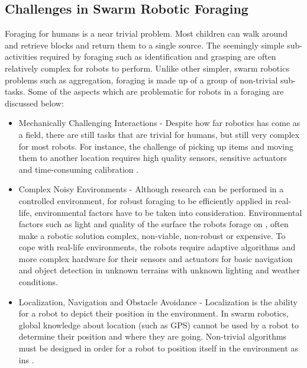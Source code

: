
\subsection{Challenges in Swarm Robotic Foraging}
\label{challengesinforaging}

Foraging for humans is a near trivial problem. Most children can walk around and retrieve blocks and return them to a single source. The seemingly simple sub-activities required by foraging such as identification and grasping are often relatively complex for robots to perform. Unlike other simpler, swarm robotics problems such as aggregation, foraging is made up of a group of non-trivial sub-tasks. Some of the aspects which are problematic for robots in a foraging are discussed below:

\begin{itemize}
\item Mechanically Challenging Interactions - Despite how far robotics has come as a field, there are still tasks that are trivial for humans, but still very complex for most robots. For instance, the challenge of picking up items \cite{saxena2008robotic} and moving them to another location requires high quality sensors, sensitive actuators and time-consuming calibration \cite{mondada2005cooperation}. 

\item Complex Noisy Environments - Although research can be performed in a controlled environment, for robust foraging to be efficiently applied in real-life, environmental factors have to be taken into consideration. Environmental factors such as light \cite{browning2005real,jungel2003real} and quality of the surface the robots forage on \cite{trianni2006cooperative}, often make a robotic solution complex, non-viable, non-robust or expensive. To cope with real-life environments, the robots require adaptive algorithms and more complex hardware for their sensors and actuators for basic navigation and object detection in unknown terrains with unknown lighting and weather conditions. 

\item Localization, Navigation and Obstacle Avoidance - Localization is the ability for a robot to depict their position in the environment. In swarm robotics, global knowledge about location (such as GPS) cannot be used by a robot to determine their position and where they are going. Non-trivial algorithms must be designed in order for a robot to position itself in the environment as ins \cite{zhou2012motion,rothermich2004distributed,arkin1992cooperation}. 

\end{itemize}

